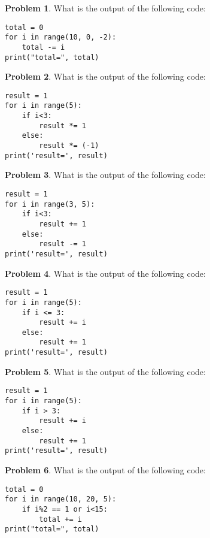 \documentclass[10pt]{article}
\theoremstyle{definition}
\newtheorem{problem}{Problem}
\begin{document}
\begin{problem}
    What is the output of the following code:
\end{problem}
\begin{lstlisting}
total = 0
for i in range(10, 0, -2):
    total -= i
print("total=", total)
\end{lstlisting}
\vspace{2in}



\begin{problem}
    What is the output of the following code:
\end{problem}
\begin{lstlisting}
result = 1
for i in range(5):
    if i<3:
        result *= 1
    else:
        result *= (-1)
print('result=', result)
\end{lstlisting}
\vspace{2in}

\begin{problem}
    What is the output of the following code:
\end{problem}
\begin{lstlisting}
result = 1
for i in range(3, 5):
    if i<3:
        result += 1
    else:
        result -= 1
print('result=', result)
\end{lstlisting}
\vspace{2in}



\begin{problem}
    What is the output of the following code:
\end{problem}
\begin{lstlisting}
result = 1
for i in range(5):
    if i <= 3:
        result += i
    else:
        result += 1
print('result=', result)
\end{lstlisting}
\vspace{2in}

\begin{problem}
    What is the output of the following code:
\end{problem}
\begin{lstlisting}
result = 1
for i in range(5):
    if i > 3:
        result += i
    else:
        result += 1
print('result=', result)
\end{lstlisting}
\vspace{2in}

\begin{problem}
    What is the output of the following code:
\end{problem}
\begin{lstlisting}
total = 0
for i in range(10, 20, 5):
    if i%2 == 1 or i<15:
        total += i
print("total=", total)
\end{lstlisting}
\vspace{2in}
\end{document}
